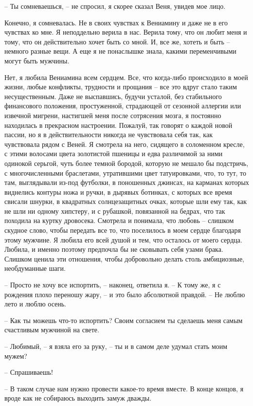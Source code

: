\documentclass[
]{book}
\begin{document}
-- Ты сомневаешься, -- не спросил, я скорее сказал Веня, увидев мое лицо.

Конечно, я сомневалась. Не в своих чувствах к Вениамину и даже не в его чувствах ко мне. Я неподдельно верила в нас. Верила тому, что он любит меня и тому, что он действительно хочет быть со мной. И, все же, хотеть и быть -- немного разные вещи. А еще я не понаслышке знала, какими переменчивыми могут быть мужчины.

Нет, я любила Вениамина всем сердцем. Все, что когда-либо происходило в моей жизни, любые конфликты, трудности и прощания -- все это вдруг стало таким несущественным. Даже не выспавшись, будучи усталой, без стабильного финансового положения, простуженной, страдающей от сезонной аллергии или извечной мигрени, настигшей меня после сотрясения мозга, я постоянно находилась в прекрасном настроении. Пожалуй, так говорят о каждой новой пассии, но я в действительности никогда не чувствовала себя так, как чувствовала рядом с Веней. Я смотрела на него, сидящего в соломенном кресле, с этими волосами цвета золотистой пшеницы и едва различимой за ними одинокой серьгой, чуть более темной бородой, которую не мешало бы подстричь, с многочисленными браслетами, утратившими цвет татуировками, что, то тут, то там, выглядывали из-под футболки, в поношенных джинсах, на карманах которых виднелись контуры ножа и ручки, в дырявых ботинках, с которых все время свисали шнурки, в квадратных солнцезащитных очках, которые шли ему так, как не шли ни одному хипстеру, и с рубашкой, повязанной на бедрах, что так походила на куртку дровосека. Смотрела и понимала, что любовь -- слишком скудное слово, чтобы передать все то, что поселилось в моем сердце благодаря этому мужчине. Я любила его всей душой и тем, что осталось от моего сердца. Любила, и именно поэтому предпочла бы не сковывать себя узами брака. Слишком ценила эти отношения, чтобы добровольно делать столь амбициозные, необдуманные шаги.

-- Просто не хочу все испортить, -- наконец, ответила я. -- К тому же, я с рождения плохо переношу жару, -- и это было абсолютной правдой. -- Не люблю лето и люблю осень.

-- Как ты можешь что-то испортить? Своим согласием ты сделаешь меня самым счастливым мужчиной на свете.

-- Любимый, -- я взяла его за руку, -- ты и в самом деле удумал стать моим мужем?

-- Спрашиваешь!

-- В таком случае нам нужно провести какое-то время вместе. В конце концов, я вроде как не собираюсь выходить замуж дважды.
\end{document}
